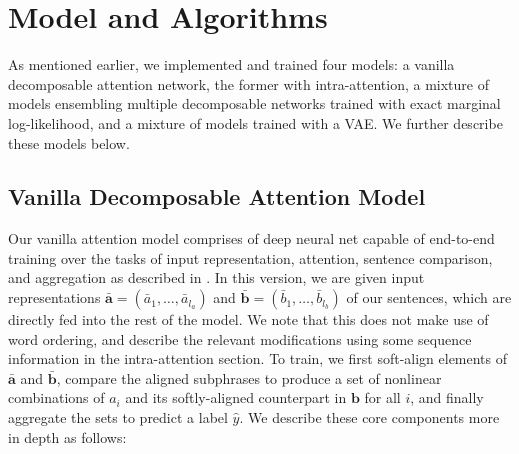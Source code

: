 \documentclass[11pt]{article}
\begin{document}


\section{Model and Algorithms}
As mentioned earlier, we implemented and trained four models: a vanilla decomposable attention network, the former with intra-attention, a mixture of models ensembling multiple decomposable networks trained with exact marginal log-likelihood, and a mixture of models trained with a VAE. We further describe these models below.

\subsection{Vanilla Decomposable Attention Model}
Our vanilla attention model comprises of deep neural net capable of end-to-end training over the tasks of input representation, attention, sentence comparison, and aggregation as described in \citep{DBLP:journals/corr/ParikhT0U16}. In this version, we are given input representations $\bar{\mathbf{a}} = (\bar{a}_1, \ldots, \bar{a}_{l_a})$ and $\bar{\mathbf{b}} = (\bar{b}_1, \ldots, \bar{b}_{l_b})$ of our sentences, which are directly fed into the rest of the model. We note that this does not make use of word ordering, and describe the relevant modifications using some sequence information in the intra-attention section. To train, we first soft-align elements of $\bar{\mathbf{a}}$ and $\bar{\mathbf{b}}$, compare the aligned subphrases to produce a set of nonlinear combinations of $a_i$ and its softly-aligned counterpart in $\mathbf{b}$ for all $i$, and finally aggregate the sets to predict a label $\hat{y}$. We describe these core components more in depth as follows:
\end{document}
